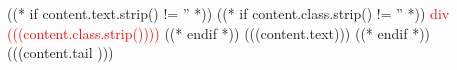 ((* if content.text.strip() != '' *))
((* if content.class.strip() != '' *)) \textcolor{red}{div (((content.class.strip())))} ((* endif *))
(((content.text)))
((* endif *))
(((content.tail )))

